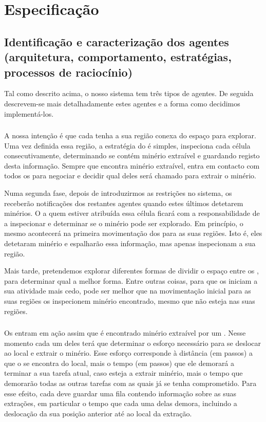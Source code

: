 \documentclass[12pt]{report}
\begin{document}
\chapter{Especificação}

\section{Identificação e caracterização dos agentes (arquitetura, comportamento, estratégias, processos de raciocínio)}
Tal como descrito acima, o nosso sistema tem três tipos de agentes. De seguida descrevem-se mais detalhadamente estes agentes e a forma como decidimos implementá-los.

\subsection{\Spotter}
A nossa intenção é que cada \spotter tenha a sua região conexa do espaço para explorar. Uma vez definida essa região, a estratégia do \Spotter é simples, inspeciona cada célula consecutivamente, determinando se contém minério extraível e guardando registo desta informação. Sempre que encontra minério extraível, entra em contacto com todos os \producers para negociar e decidir qual deles será chamado para extrair o minério.

Numa segunda fase, depois de introduzirmos as restrições no sistema, os \spotters receberão notificações dos restantes agentes quando estes últimos detetarem minérios. O \spotter a quem estiver atribuída essa célula ficará com a responsabilidade de a inspecionar e determinar se o minério pode ser explorado. Em princípio, o mesmo acontecerá na primeira movimentação dos \spotters para as suas regiões. Isto é, eles detetaram minério e espalharão essa informação, mas apenas inspecionam a sua região.

Mais tarde, pretendemos explorar diferentes formas de dividir o espaço entre os \spotters, para determinar qual a melhor forma. Entre outras coisas, para que os \producers iniciam a sua atividade mais cedo, pode ser melhor que na movimentação inicial para as suas regiões os \spotters inspecionem minério encontrado, mesmo que não esteja nas suas regiões.

\subsection{\Producer}
Os \producers entram em ação assim que é encontrado minério extraível por um \spotter. Nesse momento cada um deles terá que determinar o esforço necessário para se deslocar ao local e extrair o minério. Esse esforço corresponde à distância (em passos) a que o \producer se encontra do local, mais o tempo (em passos) que ele demorará a terminar a sua tarefa atual, caso esteja a extrair minério, mais o tempo que demorarão todas as outras tarefas com as quais já se tenha comprometido. Para esse efeito, cada \producer deve guardar uma fila contendo informação sobre as suas extrações, em particular o tempo que cada uma delas demora, incluindo a deslocação da sua posição anterior até ao local da extração.
\end{document}
